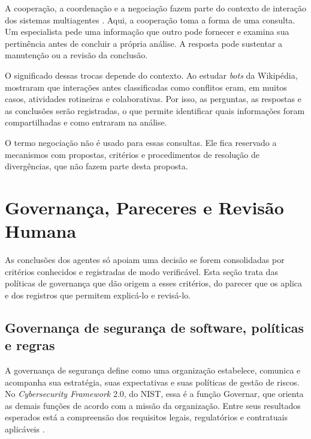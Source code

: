 A cooperação, a coordenação e a negociação fazem parte do contexto de interação dos sistemas multiagentes \cite{lazarin2025}. Aqui, a cooperação toma a forma de uma consulta. Um especialista pede uma informação que outro pode fornecer e examina sua pertinência antes de concluir a própria análise. A resposta pode sustentar a manutenção ou a revisão da conclusão.

O significado dessas trocas depende do contexto. Ao estudar \textit{bots} da Wikipédia,  mostraram que interações antes classificadas como conflitos eram, em muitos casos, atividades rotineiras e colaborativas. Por isso, as perguntas, as respostas e as conclusões serão registradas, o que permite identificar quais informações foram compartilhadas e como entraram na análise.

O termo negociação não é usado para essas consultas. Ele fica reservado a mecanismos com propostas, critérios e procedimentos de resolução de divergências, que não fazem parte desta proposta.

\section{Governança, Pareceres e Revisão Humana}
\label{rt-2-5}

As conclusões dos agentes só apoiam uma decisão se forem consolidadas por critérios conhecidos e registradas de modo verificável. Esta seção trata das políticas de governança que dão origem a esses critérios, do parecer que os aplica e dos registros que permitem explicá-lo e revisá-lo.

\subsection{Governança de segurança de software, políticas e regras}
\label{rt-2-5-1}

A governança de segurança define como uma organização estabelece, comunica e acompanha sua estratégia, suas expectativas e suas políticas de gestão de riscos. No \textit{Cybersecurity Framework} 2.0, do NIST, essa é a função Governar, que orienta as demais funções de acordo com a missão da organização. Entre seus resultados esperados está a compreensão dos requisitos legais, regulatórios e contratuais aplicáveis \cite{nistCsf2}.

